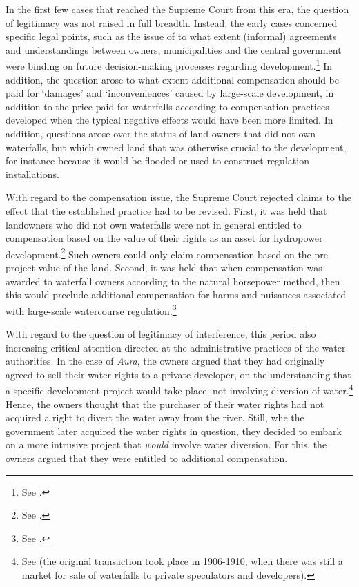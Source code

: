 In the first few cases that reached the Supreme Court from this era, the question of legitimacy was not raised in full breadth. Instead, the early cases concerned specific legal points, such as the issue of to what extent (informal) agreements and understandings between owners, municipalities and the central government were binding on future decision-making processes regarding development.\footnote{See \cite{aura61,mardola73}.} In addition, the question arose to what extent additional compensation should be paid for `damages' and `inconveniences' caused by large-scale development, in addition to the price paid for waterfalls according to compensation practices developed when the typical negative effects would have been more limited. In addition, questions arose over the status of land owners that did not own waterfalls, but which owned land that was otherwise crucial to the development, for instance because it would be flooded or used to construct regulation installations.

With regard to the compensation issue, the Supreme Court rejected claims to the effect that the established practice had to be revised. First, it was held that landowners who did not own waterfalls were not in general entitled to compensation based on the value of their rights as an asset for hydropower development.\footnote{See \cite[332-333]{tokke63}.} Such owners could only claim compensation based on the pre-project value of the land. Second, it was held that when compensation was awarded to waterfall owners according to the natural horsepower method, then this would preclude additional compensation for harms and nuisances associated with large-scale watercourse regulation.\footnote{See  \cite{vikfalli71,driva82}.}

With regard to the question of legitimacy of interference, this period also increasing critical attention directed at the administrative practices of the water authorities. In the case of {\it Aura}, the owners argued that they had originally agreed to sell their water rights to a private developer, on the understanding that a specific development project would take place, not involving diversion of water.\footnote{See \cite[1284]{aura61} (the original transaction took place in 1906-1910, when there was still a market for sale of waterfalls to private speculators and developers).} Hence, the owners thought that the purchaser of their water rights had not acquired a right to divert the water away from the river. Still, whe the government later acquired the water rights in question, they decided to embark on a more intrusive project that {\it would} involve water diversion. For this, the owners argued that they were entitled to additional compensation. 

